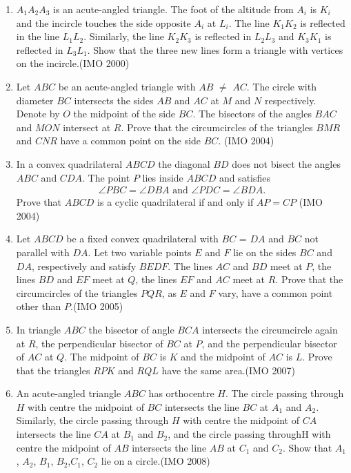 \begin{enumerate}[label=\thesubsection.\arabic*,ref=\thesubsection.\theenumi]
\item ${A_{1}} {A_{2}} {A_{3}}$ is an acute-angled triangle. The foot of the altitude from ${A_{i}}$ is ${K_{i}}$ and the incircle touches the side opposite ${A_{i}}$ at ${L_{i}}$. The line ${K_{1}}{K_{2}}$ is reflected in the line ${L_{1}}{L_{2}}$. Similarly, the line ${K_{2}}{K_{3}}$ is reflected in ${L_{2}}{L_{3}}$ and ${K_{3}}{K_{1}}$ is reflected in ${L_{3}}{L_{1}}$. Show that the three new lines form a triangle with vertices on the incircle.\hfill(IMO  2000)
\item Let $ABC$ be an acute-angled triangle  with $AB$ $\neq$ $AC$. The circle with diameter $BC$ intersects the sides $AB$ and $AC$ at $M$ and $N$ respectively. Denote by $O$ the midpoint of the side $BC$. The bisectors of the angles $BAC$ and $MON$ intersect at $R$. Prove that the circumcircles of the triangles $BMR$ and $CNR$ have a common point on the side $BC$. \hfill(IMO  2004)
 \item In a convex quadrilateral $ABCD$ the diagonal $BD$ does not bisect the angles $ABC$ and $CDA$. The point $P$ lies inside $ABCD$ and satisfies
 \begin{align*}
	 \angle{PBC}=\angle{DBA} \text{ and } \angle{PDC}=\angle{BDA}.
 \end{align*}
Prove that $ABCD$ is a cyclic quadrilateral if and only if $AP=CP$ \hfill(IMO  2004)
\item Let $ABCD$ be a fixed convex quadrilateral with $BC$ = $DA$ and
    $BC$ not parallel with $DA$. Let two variable points $E$ and $F$ lie on the sides $BC$ and $DA$, respectively and satisfy $BEDF$. The lines $AC$ and $BD$ meet at $P$, the lines $BD$ and $EF$ meet at $Q$, the lines $EF$ and $AC$ meet at $R$. Prove that the circumcircles of the triangles $PQR$, as $E$ and $F$ vary, have a common point other than $P$.\hfill(IMO  2005)
	\item In triangle $ABC$ the bisector of angle $BCA$ intersects the circumcircle again at $R$, the perpendicular bisector of $BC$ at $P$, and the perpendicular bisector of $AC$ at $Q$. The midpoint of $BC$ is $K$ and the midpoint of $AC$ is $L$. Prove that the triangles $RPK$ and $RQL$ have the same area.\hfill(IMO  2007)
	\item An acute-angled triangle $ABC$ has orthocentre $H$. The circle passing through $H$ with centre the midpoint of $BC$ intersects the line $BC$ at $A_1$ and $A_2$. Similarly, the circle passing through $H$ with centre the midpoint of $CA$ intersects the line $CA$ at $B_1$ and $B_2$, and the circle passing throughH with centre the midpoint of $AB$ intersects the line $AB$ at $C_1$ and $C_2$. Show that $A_1$, $A_2$, $B_1$, $B_2$,$C_1$, $C_2$ lie on a circle.\hfill(IMO  2008)

\end{enumerate}
